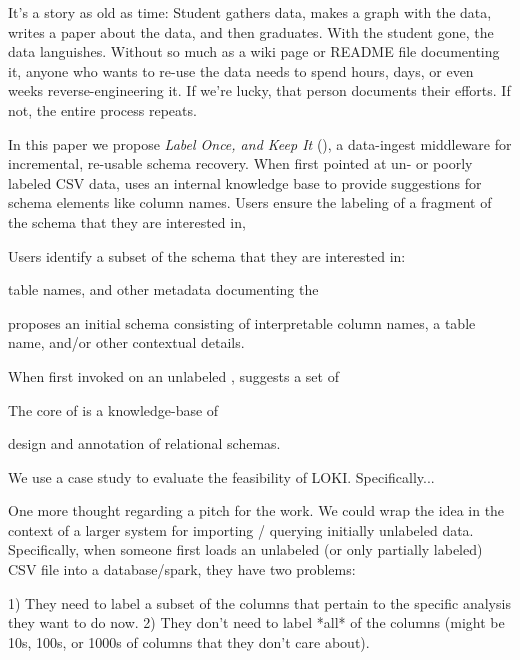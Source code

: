 
It's a story as old as time: Student gathers data, makes a graph with the data, writes a paper about the data, and then graduates.  
With the student gone, the data languishes.
Without so much as a wiki page or README file documenting it, anyone who wants to re-use the data needs to spend hours, days, or even weeks reverse-engineering it.
If we're lucky, that person documents their efforts.  
If not, the entire process repeats.

In this paper we propose \emph{Label Once, and Keep It} (\systemname), a data-ingest middleware for incremental, re-usable schema recovery.
When first pointed at un- or poorly labeled CSV data, \systemname uses an internal knowledge base to provide suggestions for schema elements like column names.  
Users ensure the labeling of a fragment of the schema that they are interested in, 


Users identify a subset of the schema that they are interested in: 





table names, and other metadata documenting the 




proposes an initial schema consisting of interpretable column names, a table name, and/or other contextual details. 




When first invoked on an unlabeled , \systemname suggests a set of 



The core of \systemname is a knowledge-base of









design and annotation of relational schemas.




We use a case study to evaluate the feasibility of LOKI.
Specifically...





One more thought regarding a pitch for the work.  We could wrap the idea in the context of a larger system for importing / querying initially unlabeled data.  Specifically, when someone first loads an unlabeled (or only partially labeled) CSV file into a database/spark, they have two problems:

1) They need to label a subset of the columns that pertain to the specific analysis they want to do now.
2) They don't need to label *all* of the columns (might be 10s, 100s, or 1000s of columns that they don't care about).  


